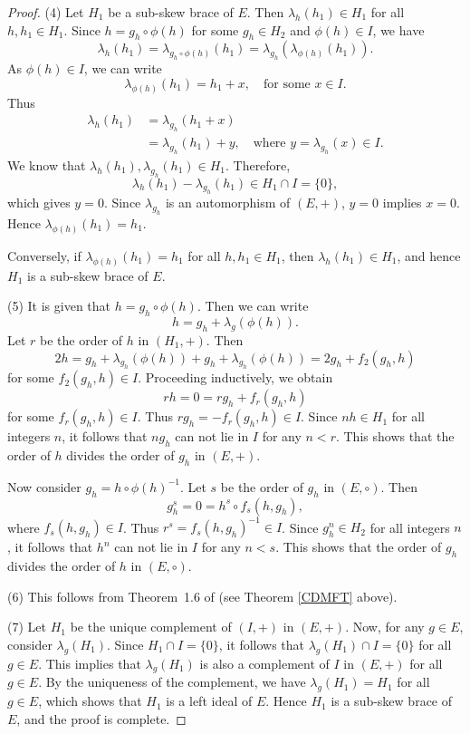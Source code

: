 \documentclass[11pt]{amsart}
\theoremstyle{thrm}
\theoremstyle{plain}
\theoremstyle{definition}
\numberwithin{equation}{section}
\begin{document}
\begin{proof}
 
(4)  Let $H_1$ be a sub-skew brace of $E$. Then $\lambda_{h}(h_1) \in H_1$ for all $h, h_1 \in H_1$.  
Since $h = g_h \circ \phi(h)$ for some $g_h \in H_2$ and $\phi(h) \in I$, we have
\[
\lambda_{h}(h_1) = \lambda_{g_h \circ \phi(h)}(h_1) = \lambda_{g_h}(\lambda_{\phi(h)}(h_1)).
\]
As $\phi(h) \in I$, we can write
\[
\lambda_{\phi(h)}(h_1) = h_1 + x, \quad \text{for some } x \in I.
\]
Thus
\begin{align*}
	\lambda_{h}(h_1) &= \lambda_{g_h}(h_1 + x) \\
	&= \lambda_{g_h}(h_1) + y, \quad \text{where } y =  \lambda_{g_h}(x) \in I.
\end{align*}
We know that  $	\lambda_{h}(h_1),  \lambda_{g_h}(h_1) \in H_1$.    Therefore,
\[
\lambda_{h}(h_1) - \lambda_{g_h}(h_1) \in H_1 \cap I =\{0\},
\]
which gives $y=0$. Since  $\lambda_{g_h}$ is an automorphism of $(E, +)$, $y=0$ implies $x=0$.  Hence $\lambda_{\phi(h)}(h_1) = h_1$.

Conversely, if $\lambda_{\phi(h)}(h_1) = h_1$ for all $h, h_1 \in H_1$, then $\lambda_{h}(h_1) \in H_1$, 
and hence $H_1$ is a sub-skew brace of $E$.

(5)  It is given that $h = g_h \circ \phi(h)$. Then we can write
\[
h = g_h + \lambda_g(\phi(h)).
\]
Let $r$ be the order of $h$ in $(H_1, +)$. Then
\[
2h = g_h + \lambda_{g_h}(\phi(h)) + {g_h} + \lambda_{g_h}(\phi(h)) = 2g_h + f_2(g_h,h)
\]
for some $f_2(g_h,h) \in I$. Proceeding inductively, we obtain
\[
rh = 0 = rg_h + f_r(g_h,h)
\]
for some $f_r(g_h,h) \in I$. Thus $r g_h = -  f_r(g_h,h) \in I$. Since $nh \in H_1$ for all integers $n$, it follows that $ng_h$ can not lie in $I$ for any $n < r$. This shows that the order of $h$ divides the order of $g_h$ in $(E, +)$. 

Now consider $g_h = h \circ \phi(h)^{-1}$. Let $s$ be the order of $g_h$ in $(E, \circ)$. Then 
$$g_h^s =0 =  h^s \circ f_s(h, g_h),$$
where $ f_s(h, g_h) \in I$. Thus $r^s =  f_s(h, g_h)^{-1} \in I$. Since $g_h^n \in H_2$ for all integers $n$, it follows that $h^n$ can not lie in $I$ for any $n < s$. This shows that the order of $g_h$ divides the order of $h$ in $(E, \circ)$. 

(6) This follows from  Theorem~1.6 of \cite{CDMFT25} (see Theorem \ref{CDMFT} above). 

(7)  Let $H_1$ be the unique complement of $(I, +)$ in $(E, +)$.  Now, for any $g \in E$, consider $\lambda_g(H_1)$. Since $H_1 \cap I = \{0\}$, it follows that $\lambda_g(H_1) \cap I = \{0\}$  for all $g \in E$.  This implies that $\lambda_g(H_1)$ is also a complement of $I$ in $(E, +)$ for all $g \in E$. By the uniqueness of the complement, we have $\lambda_g(H_1) = H_1$ for all $g \in E$, which shows that $H_1$ is a left ideal of $E$. Hence $H_1$ is a sub-skew brace of $E$, and the proof is  complete.
\end{proof}
\end{document}
